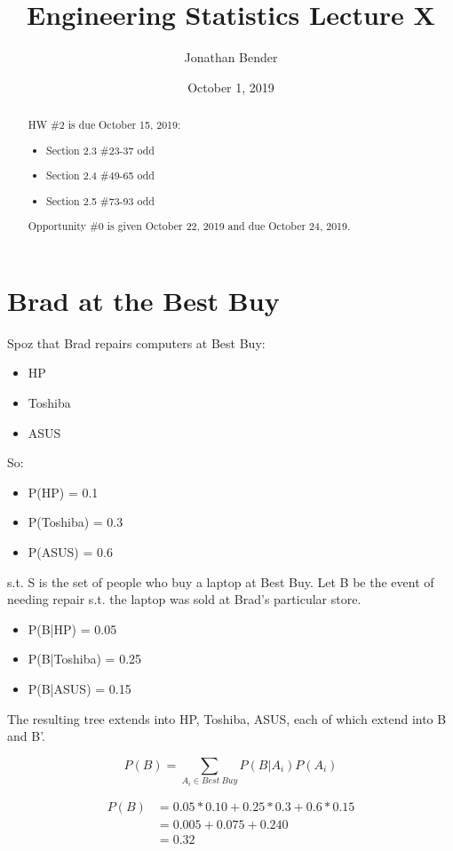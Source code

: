 \documentclass[]{article}
\title{Engineering Statistics Lecture X}
\author{Jonathan Bender}
\date{October 1, 2019}
\begin{document}
	
	\maketitle
	
	\begin{abstract}	
		HW \#2 is due October 15, 2019:
		\begin{itemize}
			\item Section 2.3 \#23-37 odd
			\item Section 2.4 \#49-65 odd
			\item Section 2.5 \#73-93 odd
		\end{itemize}
	
		Opportunity \#0 is given October 22, 2019 and due October 24, 2019.
	\end{abstract}
	
	\section{Brad at the Best Buy}
	
	Spoz that Brad repairs computers at Best Buy:
	\begin{itemize}
		\item HP
		\item Toshiba
		\item ASUS
	\end{itemize}

	So:
	
	\begin{itemize}
		\item P(HP) = 0.1
		\item P(Toshiba) = 0.3
		\item P(ASUS) = 0.6
	\end{itemize}
	s.t. S is the set of people who buy a laptop at Best Buy.
	Let B be the event of needing repair s.t. the laptop was sold at Brad's particular store.
	
	\begin{itemize}
		\item P(B|HP) = 0.05 
		\item P(B|Toshiba) = 0.25 
		\item P(B|ASUS) = 0.15
	\end{itemize}

	The resulting tree extends into HP, Toshiba, ASUS, each of which extend into B and B'.
	
	$$P(B) = \sum_{A_i\in Best\ Buy}P(B|A_i)P(A_i)$$
	
	\begin{align*}
		P(B) &= 0.05*0.10 + 0.25*0.3 + 0.6*0.15 \\
		     &= 0.005 + 0.075 + 0.240 \\
		     &= 0.32
	\end{align*}
	\pagebreak
\end{document}
